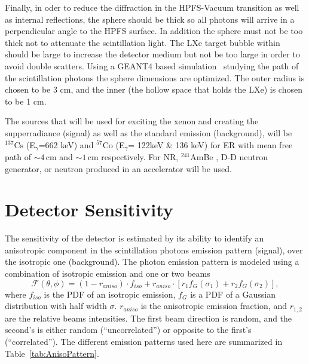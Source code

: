 Finally, in oder to reduce the diffraction in the HPFS-Vacuum transition as well as internal reflections, the sphere should be thick so all photons will arrive in a perpendicular angle to the HPFS surface. In addition the sphere must not be too thick not to attenuate the scintillation light. The LXe target bubble within should be large to increase the detector medium but not be too large in order to avoid double scatters. Using a GEANT4 based simulation~\cite{AGOSTINELLI2003250} studying the path of the scintillation photons the sphere dimensions are optimized. The outer radius is chosen to be 3 cm, and the inner (the hollow space that holds the LXe) is chosen to be 1 cm. 


The sources that will be used for exciting the xenon and creating the supperradiance (signal) as well as the standard emission (background), will be $^{137} \mathrm{Cs}$ 
(E$_\gamma$=662 keV) and $^{57} \mathrm{Co}$ (E$_\gamma$= 122keV \& 136 keV) for ER with mean free path of $\sim4$\,cm and $\sim1$\,cm respectively. For NR, $^{241}$AmBe , D-D neutron generator, or neutron produced in an accelerator will be used. 



\FloatBarrier
\section{Detector Sensitivity}
\label{sec:sim}
The sensitivity of the detector is estimated by its ability to identify an anisotropic component in the scintillation photons emission pattern (signal), over the isotropic one (background). The photon emission pattern is modeled using a combination of isotropic emission and one or two beams
\begin{equation}
\mathcal{F}(\theta,\phi) = (1-r_{aniso}) \cdot f_{iso} + r_{aniso}\cdot\left[r_1 f_G(\sigma_1) + r_2 f_G(\sigma_2) \right], 
\end{equation}  
where  $f_{iso}$ is the PDF of an isotropic emission, $f_G$ is a PDF of a Gaussian distribution with half width $\sigma$. $r_{aniso}$ is the anisotropic emission fraction, and $r_{1,2}$ are the relative beams intensities. The first beam direction is random, and the second's is either random 
(``uncorrelated'') or opposite to the first's (``correlated''). The different emission patterns used here are summarized in Table~\ref{tab:AnisoPattern}.
 
